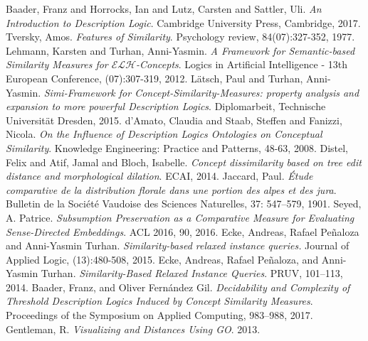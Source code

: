 \documentclass[]{llncs}
\newcommand{\elh}{\(\mathcal{ELH}\)\xspace}
\begin{document}
  \begin{thebibliography}{1}
      Baader, Franz and Horrocks, Ian and Lutz, Carsten and Sattler, Uli.
      \textit{An Introduction to Description Logic}.
      Cambridge University Press, Cambridge, 2017.
      Tversky, Amos.
      \textit{Features of Similarity}.
      Psychology review, 84(07):327-352, 1977.
      Lehmann, Karsten and Turhan, Anni-Yasmin.
      \textit{A Framework for Semantic-based Similarity Measures for \elh-Concepts}.
      Logics in Artificial Intelligence - 13th European Conference, (07):307-319, 2012.
      Lätsch, Paul and Turhan, Anni-Yasmin.
      \textit{Simi-Framework for Concept-Similarity-Measures: property analysis and expansion to more powerful Description Logics}.
      Diplomarbeit, Technische Universität Dresden, 2015.
      d’Amato, Claudia and Staab, Steffen and Fanizzi, Nicola.
      \textit{On the Influence of Description Logics Ontologies on Conceptual Similarity}.
      Knowledge Engineering: Practice and Patterns, 48-63, 2008.
      Distel, Felix and Atif, Jamal and Bloch, Isabelle.
      \textit{Concept dissimilarity based on tree edit  distance and morphological dilation}.
      ECAI, 2014.
      Jaccard, Paul.
      \textit{\'Etude comparative de la distribution florale dans une portion des alpes et des jura}.
      Bulletin de la Société Vaudoise des Sciences Naturelles, 37: 547–579, 1901.
      Seyed, A. Patrice.
      \textit{Subsumption Preservation as a Comparative Measure for Evaluating Sense-Directed Embeddings}.
      ACL 2016, 90, 2016.
    Ecke, Andreas, Rafael Peñaloza and Anni-Yasmin Turhan.
    \textit{Similarity-based relaxed instance queries.}
    Journal of Applied Logic, (13):480-508, 2015.
    Ecke, Andreas, Rafael Peñaloza, and Anni-Yasmin Turhan.
    \textit{Similarity-Based Relaxed Instance Queries}.
    PRUV, 101–113, 2014.
    Baader, Franz, and Oliver Fernández Gil.
    \textit{Decidability and Complexity of Threshold Description Logics Induced by Concept Similarity Measures}.
    Proceedings of the Symposium on Applied Computing, 983–988, 2017.
    Gentleman, R.
    \textit{Visualizing and Distances Using GO}.
    2013.%
  \end{thebibliography}
\end{document}
